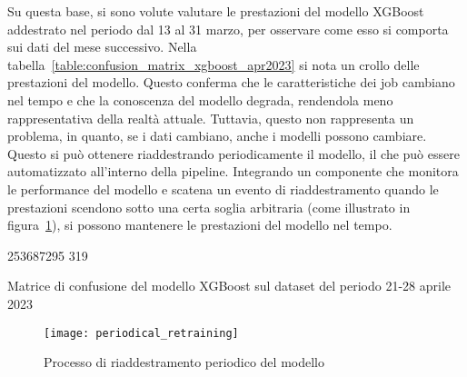 Su questa base, si sono volute valutare le prestazioni del modello XGBoost
addestrato nel periodo dal 13 al 31 marzo, per osservare come esso si comporta
sui dati del mese successivo. Nella
tabella~\ref{table:confusion_matrix_xgboost_apr2023} si nota un crollo delle
prestazioni del modello. Questo conferma che le caratteristiche dei job
cambiano nel tempo e che la conoscenza del modello degrada, rendendola meno
rappresentativa della realtà attuale. Tuttavia, questo non rappresenta un
problema, in quanto, se i dati cambiano, anche i modelli possono cambiare.
Questo si può ottenere riaddestrando periodicamente il modello, il che può
essere automatizzato all'interno della pipeline. Integrando un componente che
monitora le performance del modello e scatena un evento di riaddestramento
quando le prestazioni scendono sotto una certa soglia arbitraria (come
illustrato in figura~\ref{fig:periodical_retraining}), si possono mantenere le
prestazioni del modello nel tempo.

\begin{table}[!ht]
    \centering
    \confusionmatrix%
    {253687}{295}%
    {31}{9}
    \caption{\small Matrice di confusione del modello XGBoost sul dataset del periodo
    21-28 aprile 2023}
    \label{table:confusion_matrix_xgboost_apr2023}
\end{table}

\begin{figure}[!ht]
    \centering
    \texttt{[image: periodical\_retraining]}
    \caption{Processo di riaddestramento periodico del modello}
    \label{fig:periodical_retraining}
\end{figure}
